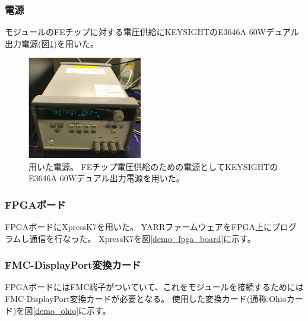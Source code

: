 \subsubsection{電源}
モジュールのFEチップに対する電圧供給にKEYSIGHTのE3646A 60Wデュアル出力電源\cite{5-1}(図\ref{demo_power_supply})を用いた。
\begin{figure}[h]\centering
\includegraphics[width=5cm]{./power_supply.png}
\caption[用いた電源]{用いた電源。 FEチップ電圧供給のための電源としてKEYSIGHTのE3646A 60Wデュアル出力電源\cite{5-1}を用いた。}
\label{demo_power_supply}
\end{figure}

\subsubsection{FPGAボード}
FPGAボードにXpressK7\cite{5-2}を用いた。
YARRファームウェアをFPGA上にプログラムし通信を行なった。
XpressK7を図\ref{demo_fpga_board}に示す。

\subsubsection{FMC-DisplayPort変換カード}
FPGAボードにはFMC端子がついていて、これをモジュールを接続するためにはFMC-DisplayPort変換カードが必要となる。
使用した変換カード(通称:Ohioカード)を図\ref{demo_ohio}に示す。

